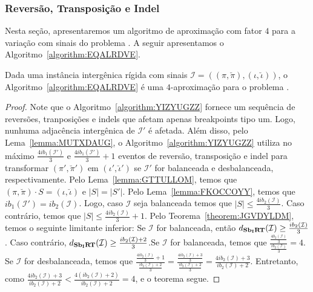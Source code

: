 \subsubsection{Reversão, Transposição e Indel}

Nesta seção, apresentaremos um algoritmo de aproximação com fator $4$ para a variação com sinais do problema \SbIRTI{}. A seguir apresentamos o Algoritmo~\ref{algorithm:EQALRDVE}.



\begin{theorem}\label{theorem:PTXWEJRJ}
Dada uma instância intergênica rígida com sinais $\mathcal{I}=((\pi,\breve\pi),(\iota,\breve\iota))$, o Algoritmo~\ref{algorithm:EQALRDVE} é uma $4$-aproximação para o problema \SbIRTI{}.
\end{theorem}
\begin{proof}
Note que o Algoritmo~\ref{algorithm:YIZYUGZZ} fornece um sequência de reversões, tranposições e indels que afetam apenas breakpoints tipo um. Logo, nunhuma adjacência intergênica de $\mathcal{I'}$ é afetada. Além disso, pelo Lema~\ref{lemma:MUTXDAUG}, o Algoritmo~\ref{algorithm:YIZYUGZZ} utiliza no máximo $\frac{4ib_1(\mathcal{I'})}{3}$ e $\frac{4ib_1(\mathcal{I'})}{3} + 1$ eventos de reversão, transposição e indel para transformar $(\pi',\breve\pi')$ em $(\iota',\breve\iota')$ se $\mathcal{I'}$ for balanceada e desbalanceada, respectivamente. Pelo Lema~\ref{lemma:GTTULLOM}, temos que $(\pi,\breve\pi) \cdot S = (\iota,\breve\iota)$ e $|S| = |S'|$. Pelo Lema~\ref{lemma:FKOCCOYY}, temos que $ib_1(\mathcal{I'}) = ib_2(\mathcal{I})$. Logo, caso $\mathcal{I}$ seja balanceada temos que $|S| \le \frac{4ib_2(\mathcal{I})}{3}$. Caso contrário, temos que $|S| \le \frac{4ib_2(\mathcal{I})}{3} + 1$. Pelo Teorema~\ref{theorem:JGVDYLDM}, temos o seguinte limitante inferior: Se $\mathcal{I}$ for balanceada, então $d_{\textbf{Sb\textsubscript{I}RT}}(\mathcal{I}) \ge \frac{ib_2(\mathcal{I})}{3}$. Caso contrário, $d_{\textbf{Sb\textsubscript{I}RT}}(\mathcal{I}) \ge \frac{ib_2(\mathcal{I}) + 2}{3}$.Se $\mathcal{I}$ for balanceada, temos que $\frac{\frac{4b_2(\mathcal{I})}{3}}{\frac{ib_2(\mathcal{I})}{3}}=4$. Se $\mathcal{I}$ for desbalanceada,  temos que $\frac{\frac{4ib_2(\mathcal{I})}{3} + 1}{\frac{ib_2(\mathcal{I}) + 2}{3}}=\frac{\frac{4ib_2(\mathcal{I})+3}{3}}{\frac{ib_2(\mathcal{I}) + 2}{3}}=\frac{4ib_2(\mathcal{I})+3}{ib_2(\mathcal{I})+2}$. Entretanto, como $\frac{4ib_2(\mathcal{I})+3}{ib_2(\mathcal{I})+2}<\frac{4(ib_2(\mathcal{I})+2)}{ib_2(\mathcal{I})+2}=4$, e o teorema segue.
\end{proof}

